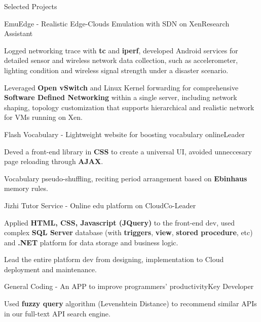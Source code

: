 \documentclass{resume} %
\begin{document}
\begin{rSection}{Selected Projects}
\begin{rSubsection}{EmuEdge - Realistic Edge-Clouds Emulation with SDN on Xen}{Research Assistant}{}{}
\item Logged networking trace with \textbf{tc} and \textbf{iperf}, developed Android services for detailed sensor and wireless network data collection, such as accelerometer, lighting condition and wireless signal strength under a disaster scenario.
\item Leveraged \textbf{Open vSwitch} and Linux Kernel forwarding for comprehensive {\bf Software Defined Networking} within a single server, including network shaping, topology customization that supports hierarchical and realistic network for VMs running on Xen.
\end{rSubsection}

\begin{rSubsection}{Flash Vocabulary - Lightweight website for boosting vocabulary online}{Leader}{}{}
\item Deved a front-end library in \textbf{CSS} to create a universal UI, avoided unneccesary page reloading through \textbf{AJAX}.
\item Vocabulary pseudo-shuffling, reciting period arrangement based on \textbf{Ebinhaus} memory rules.
\end{rSubsection}


\begin{rSubsection}{Jizhi Tutor Service - Online edu platform on Cloud}{Co-Leader}{}{}
\item Applied \textbf{HTML, CSS, Javascript (JQuery)} to the front-end dev, used complex \textbf{SQL Server} database (with \textbf{triggers}, \textbf{view}, \textbf{stored procedure}, etc) and \textbf{.NET} platform for data storage and business logic.
\item Lead the entire platform dev from designing, implementation to Cloud deployment and maintenance.
\end{rSubsection}


\begin{rSubsection}{General Coding - An APP to improve programmers' productivity}{Key Developer}{}{}
\item Used \textbf{fuzzy query} algorithm (Levenshtein Distance) to recommend similar APIs in our full-text API search engine.
\end{rSubsection}


\end{rSection}
\end{document}
